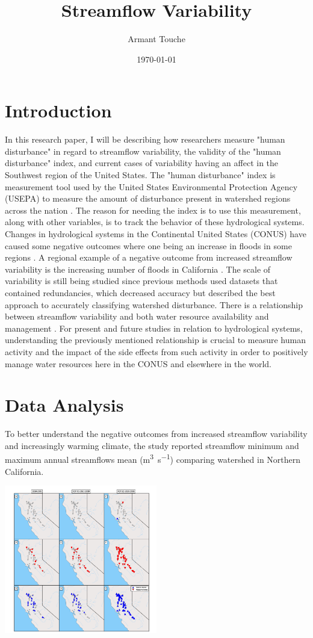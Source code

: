 \documentclass[a4paper,man,biblatex]{apa6}
\title{Streamflow Variability}
\author{Armant Touche}
\affiliation{Portland State University}
\date{\today}
\begin{document}
\section{Introduction} In this research paper, I will be describing how researchers measure "human disturbance" in regard to streamflow variability, the validity of the "human disturbance" index, and current cases of variability having an affect in the Southwest region of the United States. The "human disturbance" index is measurement tool used by the United States Environmental Protection Agency (USEPA) to measure the amount of disturbance present in watershed regions across the nation \autocite{falcone_2016}. The reason for needing the index is to use this measurement, along with other variables, is to track the behavior of these hydrological systems. Changes in hydrological systems in the Continental United States (CONUS) have caused some negative outcomes where one being an increase in floods in some regions \autocite{rice_2016}. A regional example of a negative outcome from increased streamflow variability is the increasing number of floods in California \autocite{standford_2020}. The scale of variability is still being studied since previous methods used datasets that contained redundancies, which decreased accuracy but \textcite{falcone_2016} described the best approach to accurately classifying watershed disturbance. There is a relationship between streamflow variability and both water resource availability and management \autocite{rice_2016}. For present and future studies in relation to hydrological systems, understanding the previously mentioned relationship is crucial to measure human activity and the impact of the side effects from such activity in order to positively manage water resources here in the CONUS and elsewhere in the world.
\section{Data Analysis} To better understand the negative outcomes from increased streamflow variability and increasingly warming climate, the \textcite{mallakpour_2018} study reported streamflow minimum and maximum annual streamflows mean (\si{\cubic\meter\per\second}) comparing watershed in Northern California. 

\begin{center}
    \includegraphics[width=0.5\textwidth]{stream_flow_cali}
    \label{fig:streamflow}
\end{center}
\medskip
\end{document}
